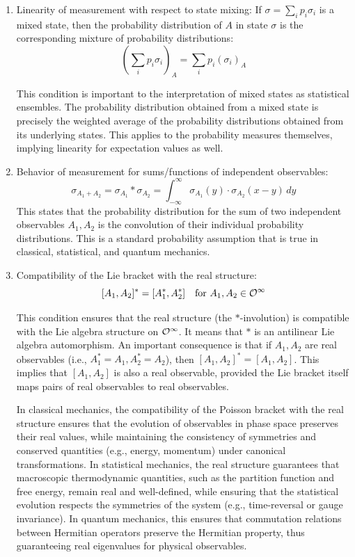\begin{enumerate}
    \item Linearity of measurement with respect to state mixing:
    If $\sigma = \sum_i p_i \sigma_i$ is a mixed state, then the probability distribution of $A$ in state $\sigma$ is the corresponding mixture of probability distributions:
    \[ \left(\sum_i p_i\sigma_{i}\right)_{A}=\sum_i p_i(\sigma_{i})_{A}\]
    
    This condition is important to the interpretation of mixed states as statistical ensembles. The probability distribution obtained from a mixed state is precisely the weighted average of the probability distributions obtained from its underlying states. This applies to the probability measures themselves, implying linearity for expectation values as well.
    
    \item Behavior of measurement for sums/functions of independent observables:
    \[ \sigma_{A_{1}+A_{2}}=\sigma_{A_{1}}*\sigma_{A_{2}}= \int_{-\infty}^{\infty} \sigma_{A_1}(y) \cdot \sigma_{A_2}(x - y) \, dy \]
    This states that the probability distribution for the sum of two independent observables $A_1, A_2$ is the convolution of their individual probability distributions. This is a standard probability assumption that is true in classical, statistical, and quantum mechanics. 
    
    \item Compatibility of the Lie bracket with the real structure:
    \[ [A_{1},A_{2}]^{*}=[A_{1}^{*},A_{2}^{*}] \quad \text{for } A_{1}, A_{2}\in\mathcal{O}^{\infty}\]
    
    This condition ensures that the real structure (the $*$-involution) is compatible with the Lie algebra structure on $\mathcal{O}^\infty$. It means that $*$ is an antilinear Lie algebra automorphism. An important consequence is that if $A_1, A_2$ are real observables (i.e., $A_1^*=A_1, A_2^*=A_2$), then $[A_1,A_2]^* = [A_1,A_2]$. This implies that $[A_1,A_2]$ is also a real observable, provided the Lie bracket itself maps pairs of real observables to real observables.
    
    In classical mechanics, the compatibility of the Poisson bracket with the real structure ensures that the evolution of observables in phase space preserves their real values, while maintaining the consistency of symmetries and conserved quantities (e.g., energy, momentum) under canonical transformations. In statistical mechanics, the real structure guarantees that macroscopic thermodynamic quantities, such as the partition function and free energy, remain real and well-defined, while ensuring that the statistical evolution respects the symmetries of the system (e.g., time-reversal or gauge invariance). In quantum mechanics, this ensures that commutation relations between Hermitian operators preserve the Hermitian property, thus guaranteeing real eigenvalues for physical observables.
    
\end{enumerate}

